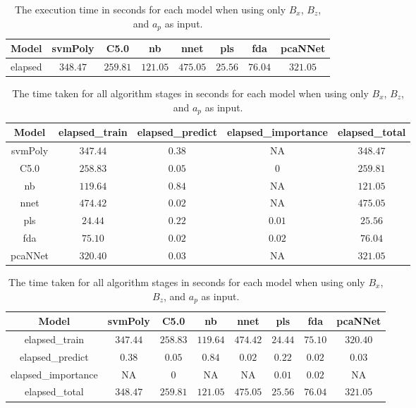 \begin{table}[!ht]
	\centering
	\begin{tabular}{|c|c|c|c|c|c|c|c|}
		\hline
		Model & svmPoly & C5.0 & nb & nnet & pls & fda & pcaNNet \\ \hline
		elapsed & $348.47$ & $259.81$ & $121.05$ & $475.05$ & $25.56$ & $76.04$ & $321.05$ \\ \hline
	\end{tabular}
	\caption{The execution time in seconds for each model when using only $B_{x}$, $B_{z}$, and $a_{p}$ as input.}
	\label{tab:time:reverse:xzap:total}
\end{table}

\begin{table}[!ht]
	\centering
	\begin{tabular}{|c|c|c|c|c|}
		\hline
		Model & elapsed_train & elapsed_predict & elapsed_importance & elapsed_total \\ \hline
		svmPoly & $347.44$ & $0.38$ & NA & $348.47$ \\ \hline
		C5.0 & $258.83$ & $0.05$ & $0$ & $259.81$ \\ \hline
		nb & $119.64$ & $0.84$ & NA & $121.05$ \\ \hline
		nnet & $474.42$ & $0.02$ & NA & $475.05$ \\ \hline
		pls & $24.44$ & $0.22$ & $0.01$ & $25.56$ \\ \hline
		fda & $75.10$ & $0.02$ & $0.02$ & $76.04$ \\ \hline
		pcaNNet & $320.40$ & $0.03$ & NA & $321.05$ \\ \hline
	\end{tabular}
	\caption{The time taken for all algorithm stages in seconds for each model when using only $B_{x}$, $B_{z}$, and $a_{p}$ as input.}
	\label{tab:time:xzap}
\end{table}

\begin{table}[!ht]
	\centering
	\begin{tabular}{|c|c|c|c|c|c|c|c|}
		\hline
		Model & svmPoly & C5.0 & nb & nnet & pls & fda & pcaNNet \\ \hline
		elapsed_train & $347.44$ & $258.83$ & $119.64$ & $474.42$ & $24.44$ & $75.10$ & $320.40$ \\ \hline
		elapsed_predict & $0.38$ & $0.05$ & $0.84$ & $0.02$ & $0.22$ & $0.02$ & $0.03$ \\ \hline
		elapsed_importance & NA & $0$ & NA & NA & $0.01$ & $0.02$ & NA \\ \hline
		elapsed_total & $348.47$ & $259.81$ & $121.05$ & $475.05$ & $25.56$ & $76.04$ & $321.05$ \\ \hline
	\end{tabular}
	\caption{The time taken for all algorithm stages in seconds for each model when using only $B_{x}$, $B_{z}$, and $a_{p}$ as input.}
	\label{tab:time:reverse:xzap}
\end{table}

